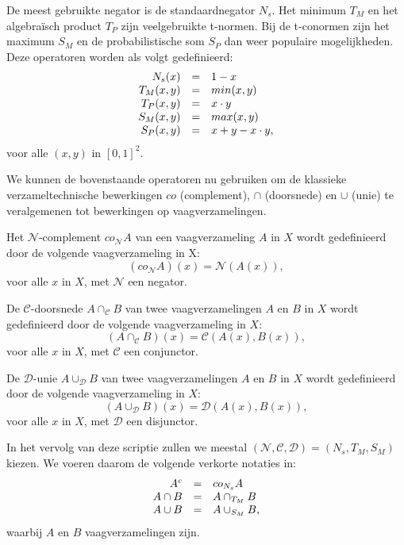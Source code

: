 De meest gebruikte negator is de standaardnegator $N_s$. Het minimum $T_M$ en het algebra\"isch 
product $T_P$ zijn veelgebruikte t-normen. Bij de t-conormen zijn het maximum $S_M$ en de
probabilistische som $S_P$ dan weer populaire mogelijkheden. Deze operatoren worden als 
volgt gedefinieerd:
$$
\begin{array}{r@{\quad=\quad}l}
N_s(x) & 1 - x \\
T_M(x,y) & min(x,y) \\
T_P(x,y) & x \cdot y \\
S_M(x,y) & max(x,y) \\
S_P(x,y) & x +y - x \cdot y,
\end{array}
$$
voor alle $(x,y)$ in $[0,1]^2$.

We kunnen de bovenstaande operatoren nu gebruiken om de klassieke verzameltechnische bewerkingen 
$co$ (complement), $\cap$ (doorsnede) en $\cup$ (unie) te
veralgemenen tot bewerkingen op vaagverzamelingen.
\begin{definitie}
Het $\mathcal{N}$-complement $co_\mathcal{N} A$ van een vaagverzameling $A$ in $X$ wordt gedefinieerd
door de volgende vaagverzameling in X:
$$
(co_\mathcal{N} A)(x) = \mathcal{N}(A(x)),
$$
voor alle $x$ in $X$, met $\mathcal{N}$ een negator.
\end{definitie}
\begin{definitie}
De $\mathcal{C}$-doorsnede $A \cap_\mathcal{C} B$ van twee vaagverzamelingen $A$ en $B$ in $X$
wordt gedefinieerd door de volgende vaagverzameling in $X$:
$$
(A \cap_\mathcal{C} B)(x) = \mathcal{C}(A(x),B(x)),
$$
voor alle $x$ in $X$, met $\mathcal{C}$ een conjunctor.
\end{definitie}
\begin{definitie}
De $\mathcal{D}$-unie $A \cup_\mathcal{D} B$ van twee vaagverzamelingen $A$ en $B$ in $X$ wordt gedefinieerd door de
volgende vaagverzameling in $X$:
$$
(A \cup_\mathcal{D} B)(x) = \mathcal{D}(A(x),B(x)),
$$
voor alle $x$ in $X$, met $\mathcal{D}$ een disjunctor.
\end{definitie}

In het vervolg van deze scriptie zullen we meestal 
$(\mathcal{N},\mathcal{C},\mathcal{D})=(N_s,T_M,S_M)$ kiezen. We voeren daarom de volgende
verkorte notaties in:
$$
\begin{array}{r@{\quad=\quad}l}
A^c 		& co_{N_s} A \\
A \cap B 	& A \cap_{T_M} B \\
A \cup B	& A \cup_{S_M} B,
\end{array}
$$
waarbij $A$ en $B$ vaagverzamelingen zijn.


